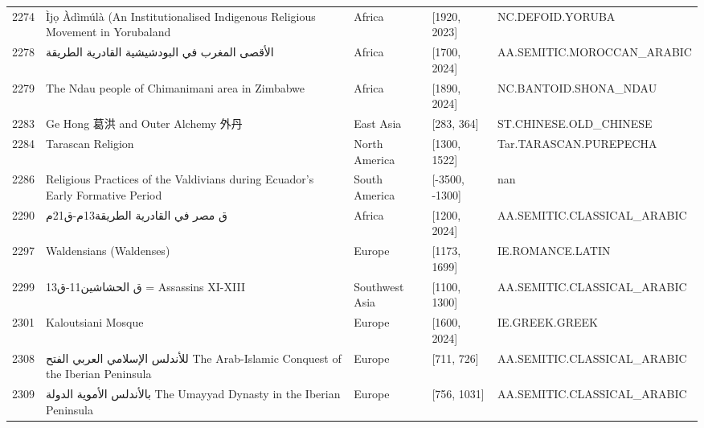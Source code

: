 {\begin{longtable}{rp{3.5cm}llp{3.5cm}}
2274 & {\raggedright Ìjọ Àdìmúlà (An Institutionalised Indigenous Religious Movement in Yorubaland} & Africa & [1920, 2023] & {\raggedright NC.\allowbreak{}DEFOID.\allowbreak{}YORUBA} \\
2278 & {\raggedright {\arabicfont الأقصى المغرب في البودشيشية القادرية الطريقة}} & Africa & [1700, 2024] & {\raggedright AA.\allowbreak{}SEMITIC.\allowbreak{}MOROCCAN\_\allowbreak{}ARABIC} \\
2279 & {\raggedright The Ndau people of Chimanimani area in Zimbabwe} & Africa & [1890, 2024] & {\raggedright NC.\allowbreak{}BANTOID.\allowbreak{}SHONA\_\allowbreak{}NDAU} \\
2283 & {\raggedright Ge Hong 葛洪 and Outer Alchemy 外丹} & East Asia & [283, 364] & {\raggedright ST.\allowbreak{}CHINESE.\allowbreak{}OLD\_\allowbreak{}CHINESE} \\
2284 & {\raggedright Tarascan Religion} & North America & [1300, 1522] & {\raggedright Tar.\allowbreak{}TARASCAN.\allowbreak{}PUREPECHA} \\
2286 & {\raggedright Religious Practices of the Valdivians during Ecuador's Early Formative Period} & South America & [-3500, -1300] & {\raggedright nan} \\
2290 & {\raggedright {\arabicfont ق مصر في القادرية الطريقة}13{\arabicfont م}-{\arabicfont ق}21{\arabicfont م}} & Africa & [1200, 2024] & {\raggedright AA.\allowbreak{}SEMITIC.\allowbreak{}CLASSICAL\_\allowbreak{}ARABIC} \\
2297 & {\raggedright Waldensians (Waldenses)} & Europe & [1173, 1699] & {\raggedright IE.\allowbreak{}ROMANCE.\allowbreak{}LATIN} \\
2299 & {\raggedright {\arabicfont ق  الحشاشين}11-{\arabicfont ق}13   =   Assassins   XI-XIII} & Southwest Asia & [1100, 1300] & {\raggedright AA.\allowbreak{}SEMITIC.\allowbreak{}CLASSICAL\_\allowbreak{}ARABIC} \\
2301 & {\raggedright Kaloutsiani Mosque} & Europe & [1600, 2024] & {\raggedright IE.\allowbreak{}GREEK.\allowbreak{}GREEK} \\
2308 & {\raggedright {\arabicfont للأندلس الإسلامي العربي الفتح} The Arab-Islamic Conquest of the Iberian Peninsula} & Europe & [711, 726] & {\raggedright AA.\allowbreak{}SEMITIC.\allowbreak{}CLASSICAL\_\allowbreak{}ARABIC} \\
2309 & {\raggedright {\arabicfont بالأندلس الأموية الدولة} The Umayyad Dynasty in the Iberian Peninsula} & Europe & [756, 1031] & {\raggedright AA.\allowbreak{}SEMITIC.\allowbreak{}CLASSICAL\_\allowbreak{}ARABIC} \\

\end{longtable}}
